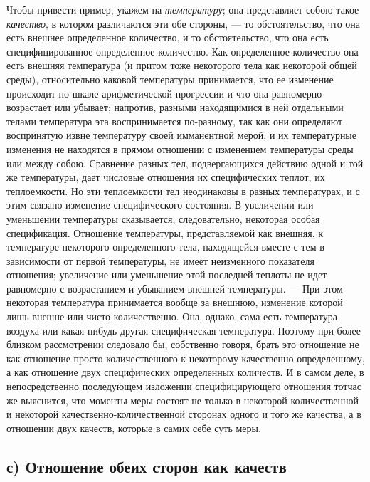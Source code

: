 Чтобы привести пример, укажем на {\em температуру}; она
представляет собою такое {\em качество}, в котором
различаются эти обе стороны, — то обстоятельство, что она есть внешнее
определенное количество, и то обстоятельство, что она есть
специфицированное определенное количество. Как определенное количество она
есть внешняя температура (и притом тоже некоторого тела как некоторой общей
среды), относительно каковой температуры принимается, что ее изменение
происходит по шкале арифметической прогрессии и что она равномерно
возрастает или убывает; напротив, разными находящимися в ней отдельными
телами температура эта воспринимается по-разному, так как они определяют
воспринятую извне температуру своей имманентной мерой, и их температурные
изменения не находятся в прямом отношении с изменением температуры среды
или между собою. Сравнение разных тел, подвергающихся действию одной и той
же температуры, дает числовые отношения их специфических теплот, их
теплоемкости. Но эти теплоемкости тел неодинаковы в разных температурах, и
с этим связано изменение специфического состояния. В увеличении или
уменьшении температуры сказывается, следовательно, некоторая особая
спецификация. Отношение температуры, представляемой как внешняя, к
температуре некоторого определенного тела, находящейся вместе с тем в
зависимости от первой температуры, не имеет неизменного показателя
отношения; увеличение или уменьшение этой последней теплоты не идет
равномерно с возрастанием и убыванием внешней температуры. — При этом
некоторая температура принимается вообще за внешнюю, изменение которой лишь
внешне или чисто количественно. Она, однако, сама есть температура воздуха
или какая-нибудь другая специфическая температура. Поэтому при более
близком рассмотрении следовало бы, собственно говоря, брать это отношение
не как отношение просто количественного к некоторому
качественно-определенному, а как отношение двух специфических определенных
количеств. И в самом деле, в непосредственно последующем изложении
специфицирующего отношения тотчас же выяснится, что моменты меры состоят не
только в некоторой количественной и некоторой качественно-количественной
сторонах одного и того же качества, а в отношении двух качеств, которые в
самих себе суть меры.


\subsection[с) Отношение обеих сторон как качеств]{с) Отношение обеих
сторон как качеств}

